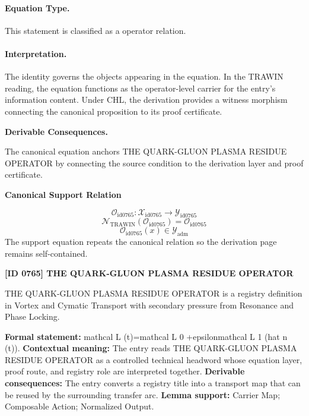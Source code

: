 \paragraph{Equation Type.}
This statement is classified as a operator relation.

\paragraph{Interpretation.}
The identity governs the objects appearing in the equation. In the TRAWIN reading, the equation functions as the operator-level carrier for the entry’s information content. Under CHL, the derivation provides a witness morphism connecting the canonical proposition to its proof certificate.

\par\vspace{0.35em}
\noindent\textbf{Derivable Consequences.}\quad
\begingroup
\footnotesize
\raggedright
The canonical equation anchors THE QUARK-GLUON PLASMA RESIDUE OPERATOR by connecting the source condition to the derivation layer and proof certificate.
\par\endgroup

\noindent\textbf{Canonical Support Relation}\par
\[
\mathcal{O}_{\mathrm{id0765}}:\mathcal{X}_{\mathrm{id0765}}\longrightarrow\mathcal{Y}_{\mathrm{id0765}}
\]
\[
\mathcal{N}_{\mathrm{TRAWIN}}(\mathcal{O}_{\mathrm{id0765}})=\mathcal{O}_{\mathrm{id0765}}
\]
\[
\mathcal{O}_{\mathrm{id0765}}(x)\in\mathcal{Y}_{\mathrm{adm}}
\]
\noindent The support equation repeats the canonical relation so the derivation page remains self-contained.\par

\clearpage
\noindent\textbf{[ID 0765] THE QUARK-GLUON PLASMA RESIDUE OPERATOR}\par
\vspace{0.35em}
\begingroup\small
{}
THE QUARK-GLUON PLASMA RESIDUE OPERATOR is a registry definition in Vortex and Cymatic Transport with secondary pressure from Resonance and Phase Locking.

\begingroup\footnotesize\setlength{\emergencystretch}{3em}\sloppy
\textbf{Formal statement:} mathcal L (t)=mathcal L 0 +epsilonmathcal L 1 (hat n (t)). \textbf{Contextual meaning:} The entry reads THE QUARK-GLUON PLASMA RESIDUE OPERATOR as a controlled technical headword whose equation layer, proof route, and registry role are interpreted together. \textbf{Derivable consequences:} The entry converts a registry title into a transport map that can be reused by the surrounding transfer arc. \textbf{Lemma support:} Carrier Map; Composable Action; Normalized Output.\par
\endgroup

